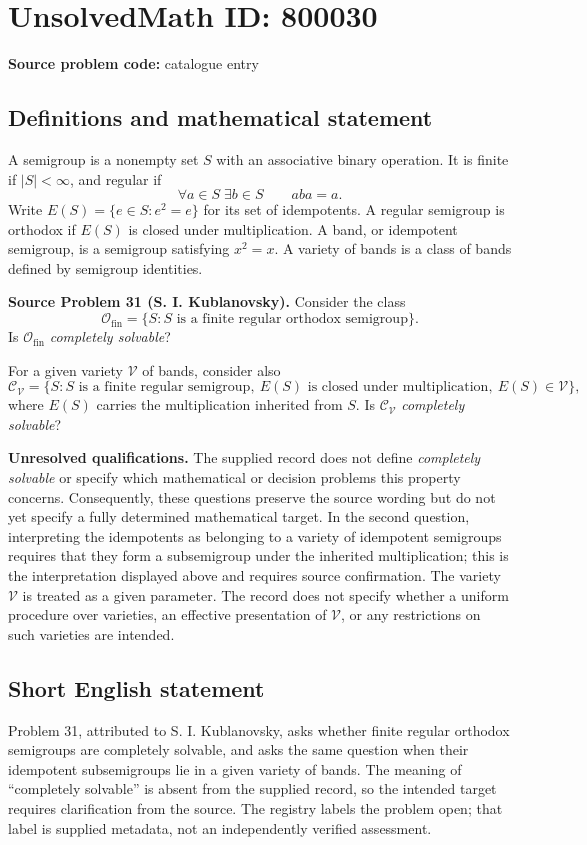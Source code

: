 \documentclass[11pt]{article}
\begin{document}
\section*{UnsolvedMath ID: 800030}
\textbf{Source problem code:} catalogue entry
\subsection{Definitions and mathematical statement}
A semigroup is a nonempty set \(S\) with an associative binary operation. It is finite if \(|S|<\infty\), and regular if
\[
\forall a\in S\;\exists b\in S\qquad aba=a.
\]
Write \(E(S)=\{e\in S:e^2=e\}\) for its set of idempotents. A regular semigroup is orthodox if \(E(S)\) is closed under multiplication. A band, or idempotent semigroup, is a semigroup satisfying \(x^2=x\). A variety of bands is a class of bands defined by semigroup identities.

\textbf{Source Problem 31 (S. I. Kublanovsky).} Consider the class
\[
\mathcal{O}_{\mathrm{fin}}
=\{S:S\text{ is a finite regular orthodox semigroup}\}.
\]
Is \(\mathcal{O}_{\mathrm{fin}}\) \emph{completely solvable}?

For a given variety \(\mathcal V\) of bands, consider also
\[
\mathcal{C}_{\mathcal V}
=\{S:S\text{ is a finite regular semigroup},\ E(S)\text{ is closed under multiplication},\ E(S)\in\mathcal V\},
\]
where \(E(S)\) carries the multiplication inherited from \(S\). Is \(\mathcal{C}_{\mathcal V}\) \emph{completely solvable}?

\textbf{Unresolved qualifications.} The supplied record does not define \emph{completely solvable} or specify which mathematical or decision problems this property concerns. Consequently, these questions preserve the source wording but do not yet specify a fully determined mathematical target. In the second question, interpreting the idempotents as belonging to a variety of idempotent semigroups requires that they form a subsemigroup under the inherited multiplication; this is the interpretation displayed above and requires source confirmation. The variety \(\mathcal V\) is treated as a given parameter. The record does not specify whether a uniform procedure over varieties, an effective presentation of \(\mathcal V\), or any restrictions on such varieties are intended.
\subsection{Short English statement}
Problem 31, attributed to S. I. Kublanovsky, asks whether finite regular orthodox semigroups are completely solvable, and asks the same question when their idempotent subsemigroups lie in a given variety of bands. The meaning of ``completely solvable'' is absent from the supplied record, so the intended target requires clarification from the source. The registry labels the problem open; that label is supplied metadata, not an independently verified assessment.
\end{document}
